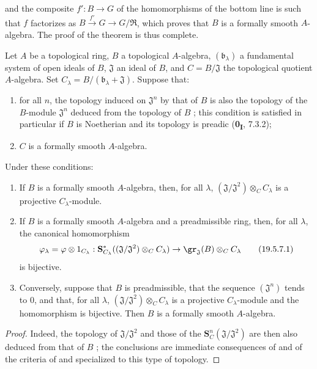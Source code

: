 and the composite $f':B\to G$ of the homomorphisms of the bottom line is such that $f$ factorizes as $B\xrightarrow{f'}G\to G/\mathfrak{R}$, which proves that $B$ is a formally smooth $A$-algebra.
The proof of the theorem  is thus complete.

\begin{corollary}[19.5.7]
\label{0.19.5.7}
Let $A$ be a topological ring, $B$ a topological $A$-algebra, $(\mathfrak{b}_\lambda)$ a fundamental system of open ideals of $B$, $\mathfrak{J}$ an ideal of $B$, and $C=B/\mathfrak{J}$ the topological quotient $A$-algebra.
Set $C_\lambda=B/(\mathfrak{b}_\lambda+\mathfrak{J})$.
Suppose that:
\begin{enumerate}
  \item[$1^\circ$] for all $n$, the topology induced on $\mathfrak{J}^n$ by that of $B$ is also the topology of the $B$-module $\mathfrak{J}^n$ deduced from the topology of $B$ ; this condition is satisfied in particular if $B$ is Noetherian and its topology is preadic (\textbf{0\textsubscript{I}}, 7.3.2);
  \item[$2^\circ$] $C$ is a formally smooth $A$-algebra.
\end{enumerate}
Under these conditions:
\begin{enumerate}
  \item[\rm(i)] If $B$ is a formally smooth $A$-algebra, then, for all $\lambda$, $(\mathfrak{J}/\mathfrak{J}^2)\otimes_C C_\lambda$ is a projective $C_\lambda$-module.
  \item[\rm(ii)] If $B$ is a formally smooth $A$-algebra and a preadmissible ring, then, for all $\lambda$, the canonical homomorphism
  \[
    \label{0.19.5.7.1}
    \varphi_\lambda=\varphi\otimes 1_{C_\lambda}:
    \mathbf{S}_{C_\lambda}^*((\mathfrak{J}/\mathfrak{J}^2)\otimes_C C_\lambda)
    \to \gr_\mathfrak{J}(B)\otimes_C C_\lambda
    \tag{19.5.7.1}
  \]
  is bijective.
  \item[\rm(iii)] Conversely, suppose that $B$ is preadmissible, that the sequence $(\mathfrak{J}^n)$ tends to $0$, and that, for all $\lambda$, $(\mathfrak{J}/\mathfrak{J}^2)\otimes_C C_\lambda$ is a projective $C_\lambda$-module and the homomorphism  is bijective.
  Then $B$ is a formally smooth $A$-algebra.
\end{enumerate}
\end{corollary}

\begin{proof}
Indeed, the topology of $\mathfrak{J}/\mathfrak{J}^2$ and those of the $\mathbf{S}_C^n(\mathfrak{J}/\mathfrak{J}^2)$ are then also deduced from that of $B$ ;
the conclusions are immediate consequences of  and of the criteria of  and  specialized to this type of topology.
\end{proof}

